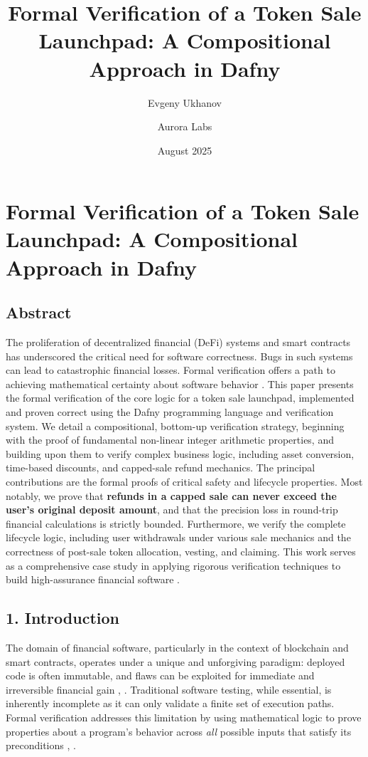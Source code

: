 \documentclass[
  english,
  onecolumn]{article}
\title{Formal Verification of a Token Sale Launchpad: A Compositional
Approach in Dafny}
\author{Evgeny Ukhanov \and Aurora Labs}
\date{August 2025}
\begin{document}
\maketitle

\section{Formal Verification of a Token Sale Launchpad: A Compositional
Approach in
Dafny}\label{formal-verification-of-a-token-sale-launchpad-a-compositional-approach-in-dafny}

\subsection{Abstract}\label{abstract}

The proliferation of decentralized financial (DeFi) systems and smart
contracts has underscored the critical need for software correctness.
Bugs in such systems can lead to catastrophic financial losses. Formal
verification offers a path to achieving mathematical certainty about
software behavior . This
paper presents the formal verification of the core logic for a token
sale launchpad, implemented and proven correct using the Dafny
programming language and verification system. We detail a compositional,
bottom-up verification strategy, beginning with the proof of fundamental
non-linear integer arithmetic properties, and building upon them to
verify complex business logic, including asset conversion, time-based
discounts, and capped-sale refund mechanics. The principal contributions
are the formal proofs of critical safety and lifecycle properties. Most
notably, we prove that \textbf{refunds in a capped sale can never exceed
the user's original deposit amount}, and that the precision loss in
round-trip financial calculations is strictly bounded. Furthermore, we
verify the complete lifecycle logic, including user withdrawals under
various sale mechanics and the correctness of post-sale token
allocation, vesting, and claiming. This work serves as a comprehensive
case study in applying rigorous verification techniques to build
high-assurance financial software
.

\subsection{1. Introduction}\label{introduction}

The domain of financial software, particularly in the context of
blockchain and smart contracts, operates under a unique and unforgiving
paradigm: deployed code is often immutable, and flaws can be exploited
for immediate and irreversible financial gain
,
. Traditional software testing,
while essential, is inherently incomplete as it can only validate a
finite set of execution paths. Formal verification addresses this
limitation by using mathematical logic to prove properties about a
program's behavior across \emph{all} possible inputs that satisfy its
preconditions ,
.
\end{document}

